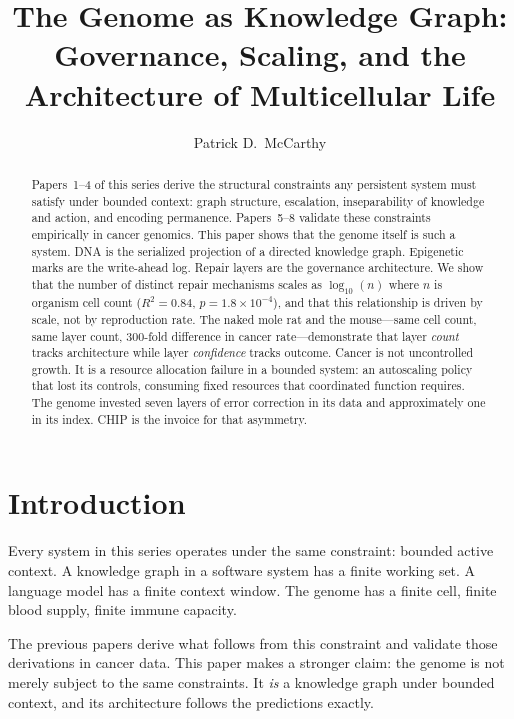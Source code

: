 \documentclass[11pt]{article}
\title{The Genome as Knowledge Graph:\\Governance, Scaling, and the Architecture of Multicellular Life}
\author{Patrick D.\ McCarthy}
\date{}
\theoremstyle{definition}
\begin{document}
\maketitle

\begin{abstract}
Papers~1--4 of this series derive the structural constraints any
persistent system must satisfy under bounded context: graph structure,
escalation, inseparability of knowledge and action, and encoding
permanence. Papers~5--8 validate these constraints empirically in
cancer genomics. This paper shows that the genome itself is such a
system. DNA is the serialized projection of a directed knowledge graph.
Epigenetic marks are the write-ahead log. Repair layers are the
governance architecture. We show that the number of distinct repair
mechanisms scales as $\log_{10}(n)$ where $n$ is organism cell count
($R^2 = 0.84$, $p = 1.8 \times 10^{-4}$), and that this relationship
is driven by scale, not by reproduction rate. The naked mole rat and
the mouse---same cell count, same layer count, 300-fold difference in
cancer rate---demonstrate that layer \emph{count} tracks architecture
while layer \emph{confidence} tracks outcome. Cancer is not uncontrolled
growth. It is a resource allocation failure in a bounded system: an
autoscaling policy that lost its controls, consuming fixed resources
that coordinated function requires. The genome invested seven layers
of error correction in its data and approximately one in its index.
CHIP is the invoice for that asymmetry.
\end{abstract}

\section{Introduction}
\label{sec:intro}

Every system in this series operates under the same constraint: bounded
active context. A knowledge graph in a software system has a finite
working set. A language model has a finite context window. The genome
has a finite cell, finite blood supply, finite immune capacity.

The previous papers derive what follows from this constraint and
validate those derivations in cancer data. This paper makes a stronger
claim: the genome is not merely subject to the same constraints. It
\emph{is} a knowledge graph under bounded context, and its architecture
follows the predictions exactly.
\end{document}
